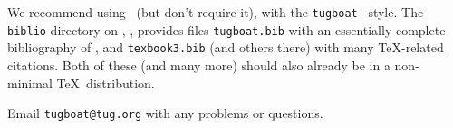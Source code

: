 \documentclass{ltugboat}
\begin{document}
We recommend using \BibTeX\ (but don't require it), with the
\texttt{tugboat} \BibTeX\ style. The \texttt{biblio} directory on \CTAN,
, provides files \texttt{tugboat.bib} with
an essentially complete bibliography of \TUB, and \texttt{texbook3.bib}
(and others there) with many \TeX-related citations. Both of these (and
many more) should also already be in a non-minimal \TeX\ distribution.

Email \verb|tugboat@tug.org| with any problems or questions.


\nocite{book-minimal}      %

\makesignature
\end{document}
